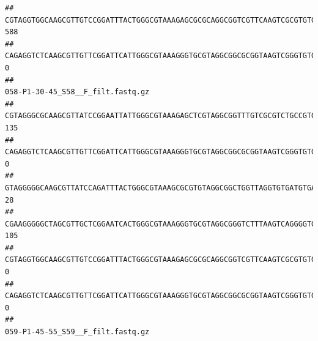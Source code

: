 \documentclass[]{article}
\begin{document}
\begin{verbatim}
## CGTAGGTGGCAAGCGTTGTCCGGATTTACTGGGCGTAAAGAGCGCGCAGGCGGTCGTTCAAGTCGCGTGTGAAAGCCCCCGGCTCAACTGGGGAGGGTCACGCGATACTGATCGACTCGAAGGCAGGAGAGGGTAGTGGAATTCCCGGTGTAGTGGTGAAATGCGTAGATATCGGGAGGAACACCAGTGGCGAAGGCGACTACCTGGCCTGTTCTTGACGCTGAGGCGCGAAAGCTAGGGGAGCAAACG                              588
## CAGAGGTCTCAAGCGTTGTTCGGATTCATTGGGCGTAAAGGGTGCGTAGGCGGCGCGGTAAGTCGGGTGTGAAATCTCGGGGCTTAACTCCGAAACTGCATTCGATACTGCCGTGCTTGAGGACTGGAGAGGAGACTGGAATTTACGGTGTAGCGGTGAAATGCGTAGATATCGTAAGGAAGACCAGTGGCGAAGGCGGGTCTCTGGACAGTTCCTGACGCTGAGGCACGAAGGCCAGGGGAGCAAACG                                0
##                                                                                                                                                                                                                                                           058-P1-30-45_S58__F_filt.fastq.gz
## CGTAGGGCGCAAGCGTTATCCGGAATTATTGGGCGTAAAGAGCTCGTAGGCGGTTTGTCGCGTCTGCCGTGAAAGTCCGGGGCTCAACTCCGGATCTGCGGTGGGTACGGGCAGACTAGAGTGATGTAGGGGAGACTGGAATTCCTGGTGTAGCGGTGAAATGCGCAGATATCAGGAGGAACACCGATGGCGAAGGCAGGTCTCTGGGCATTAACTGACGCTGAGGAGCGAAAGCATGGGGAGCGAACA                               135
## CAGAGGTCTCAAGCGTTGTTCGGATTCATTGGGCGTAAAGGGTGCGTAGGCGGCGCGGTAAGTCGGGTGTGAAATCTCGGAGCTTAACTCCGAAACTGCATTCGATACTGCCGTGCTTGAGGACTGGAGAGGAGACTGGAATTTACGGTGTAGCGGTGAAATGCGTAGATATCGTAAGGAAGACCAGTGGCGAAGGCGGGTCTCTGGACAGTTCCTGACGCTGAGGCACGAAGGCCAGGGGAGCAAACG                                 0
## GTAGGGGGCAAGCGTTATCCAGATTTACTGGGCGTAAAGCGCGTGTAGGCGGCTGGTTAGGTGTGATGTGAAATCTTCCGGCTCAACCGGAAAACTGCATTGCAAACCGGCCTGGCTAGAGTGCAGGAGAGGGAAGCGGAATTCCAGGTGTAGCGGTGAAATGCGTAGATATCTGGAGGAACACCAGTGGCGAAGGCGGCTTCCTGGCCTGCAACTGACGCTGAGACGCGAAAGCGTGGGGAGCGAAC                                 28
## CGAAGGGGGCTAGCGTTGCTCGGAATCACTGGGCGTAAAGGGTGCGTAGGCGGGTCTTTAAGTCAGGGGTGAAATCCTGGAGCTCAACTCCAGAACTGCCTTTGATACTGAAGATCTTGAGTTCGGGAGAGGTGAGTGGAACTGCGAGTGTAGAGGTGAAATTCGTAGATATTCGCAAGAACACCAGTGGCGAAGGCGGCTCACTGGCCCGATACTGACGCTGAGGCACGAAAGCGTGGGGAGCAAACA                               105
## CGTAGGTGGCAAGCGTTGTCCGGATTTACTGGGCGTAAAGAGCGCGCAGGCGGTCGTTCAAGTCGCGTGTGAAAGCCCCCGGCTCAACTGGGGAGGGTCACGCGATACTGATCGACTCGAAGGCAGGAGAGGGTAGTGGAATTCCCGGTGTAGTGGTGAAATGCGTAGATATCGGGAGGAACACCAGTGGCGAAGGCGACTACCTGGCCTGTTCTTGACGCTGAGGCGCGAAAGCTAGGGGAGCAAACG                                 0
## CAGAGGTCTCAAGCGTTGTTCGGATTCATTGGGCGTAAAGGGTGCGTAGGCGGCGCGGTAAGTCGGGTGTGAAATCTCGGGGCTTAACTCCGAAACTGCATTCGATACTGCCGTGCTTGAGGACTGGAGAGGAGACTGGAATTTACGGTGTAGCGGTGAAATGCGTAGATATCGTAAGGAAGACCAGTGGCGAAGGCGGGTCTCTGGACAGTTCCTGACGCTGAGGCACGAAGGCCAGGGGAGCAAACG                                 0
##                                                                                                                                                                                                                                                           059-P1-45-55_S59__F_filt.fastq.gz

\end{verbatim}
\end{document}
